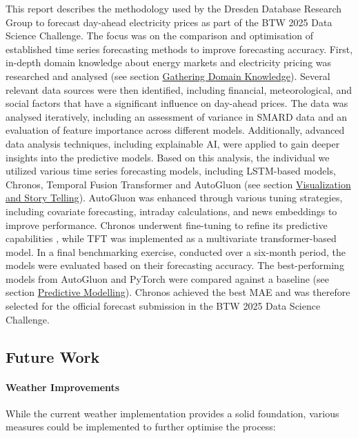 \documentclass[a4paper]{article}
\begin{document}
This report describes the methodology used by the Dresden Database
Research Group to forecast day-ahead electricity prices as part of the
BTW 2025 Data Science Challenge. The focus was on the comparison and
optimisation of established time series forecasting methods to improve
forecasting accuracy. First, in-depth domain knowledge about energy
markets and electricity pricing was researched and analysed (see section
\hyperref[gathering-domain-knowledge]{Gathering Domain Knowledge}).
Several relevant data sources were then identified, including financial,
meteorological, and social factors that have a significant influence on
day-ahead prices. The data was analysed iteratively, including an
assessment of variance in SMARD data and an evaluation of feature
importance across different models. Additionally, advanced data analysis
techniques, including explainable AI, were applied to gain deeper
insights into the predictive models. Based on this analysis, the
individual we utilized various time series forecasting models, including
LSTM-based models, Chronos, Temporal Fusion Transformer and AutoGluon
(see section
\hyperref[visualization-and-story-telling]{Visualization and Story Telling}).
AutoGluon was enhanced through various tuning strategies, including
covariate forecasting, intraday calculations, and news embeddings to
improve performance. Chronos underwent fine-tuning to refine its
predictive capabilities , while TFT was implemented as a multivariate
transformer-based model. In a final benchmarking exercise, conducted
over a six-month period, the models were evaluated based on their
forecasting accuracy. The best-performing models from AutoGluon and
PyTorch were compared against a baseline (see section
\hyperref[predictive-modeling]{Predictive Modelling}). Chronos achieved
the best MAE and was therefore selected for the official forecast
submission in the BTW 2025 Data Science Challenge.

    \subsection{Future Work}\label{future-work}

\paragraph{Weather Improvements}\label{weather-improvements}

While the current weather implementation provides a solid foundation,
various measures could be implemented to further optimise the process:
\end{document}
